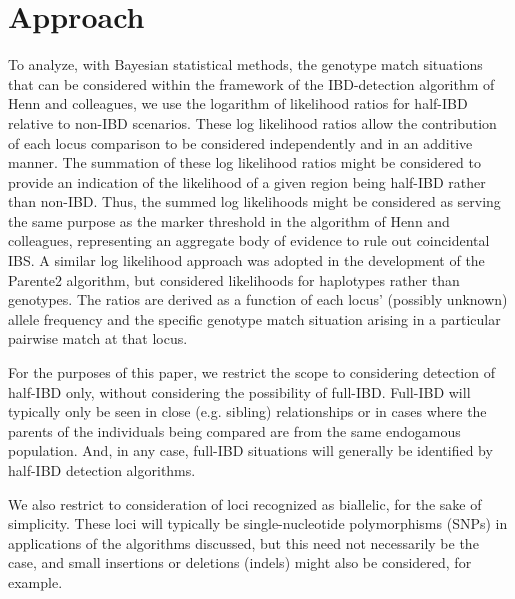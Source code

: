 \documentclass{article}
\begin{document}
\section{Approach}
To analyze, with Bayesian statistical methods, the genotype match situations that can be considered within the framework of the IBD-detection algorithm of Henn and colleagues, we use the logarithm of likelihood ratios for half-IBD relative to non-IBD scenarios. These log likelihood ratios allow the contribution of each locus comparison to be considered independently and in an additive manner. The summation of these log likelihood ratios might be considered to provide an indication of the likelihood of a given region being half-IBD rather than non-IBD. Thus, the summed log likelihoods might be considered as serving the same purpose as the marker threshold in the algorithm of Henn and colleagues, representing an aggregate body of evidence to rule out coincidental IBS. A similar log likelihood approach was adopted in the development of the Parente2 algorithm, but considered likelihoods for haplotypes rather than genotypes.\citep{Parente2} The ratios are derived as a function of each locus' (possibly unknown) allele frequency and the specific genotype match situation arising in a particular pairwise match at that locus.

For the purposes of this paper, we restrict the scope to considering detection of half-IBD only, without considering the possibility of full-IBD. Full-IBD will typically only be seen in close (e.g. sibling) relationships or in cases where the parents of the individuals being compared are from the same endogamous population. And, in any case, full-IBD situations will generally be identified by half-IBD detection algorithms.

We also restrict to consideration of loci recognized as biallelic, for the sake of simplicity. These loci will typically be single-nucleotide polymorphisms (SNPs) in applications of the algorithms discussed, but this need not necessarily be the case, and small insertions or deletions (indels) might also be considered, for example.
\end{document}
